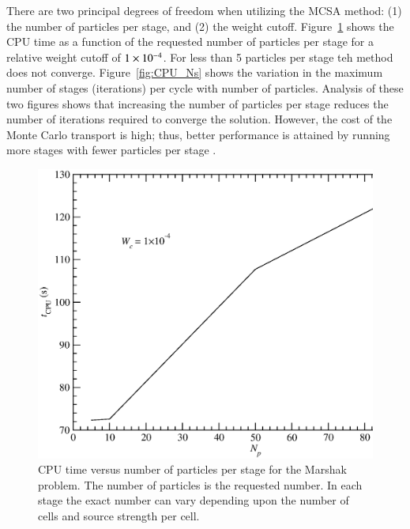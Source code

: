 \documentclass[preprint,12pt]{elsarticle}
\begin{document}
There are two principal degrees of freedom when utilizing the MCSA
method: (1) the number of particles per stage, and (2) the weight
cutoff.  Figure~\ref{fig:CPU_Np} shows the CPU time as a function of
the requested number of particles per stage for a relative weight
cutoff of $1\times 10^{-4}$.  For less than 5 particles per stage teh
method does not converge.  Figure~\ref{fig:CPU_Ns} shows the variation
in the maximum number of stages (iterations) per cycle with number of
particles.  Analysis of these two figures shows that increasing the
number of particles per stage reduces the number of iterations
required to converge the solution.  However, the cost of the Monte
Carlo transport is high; thus, better performance is attained by
running more stages with fewer particles per stage \cite{evans_2003}.

\begin{figure}[htpb!]
  \centerline{
    \includegraphics[width=5in,clip]{mrshk_np_CPU.eps}}
  \caption{CPU time versus number of particles per stage for the
    Marshak problem.  The number of particles is the requested number.
    In each stage the exact number can vary depending upon the number
    of cells and source strength per cell.}
  \label{fig:CPU_Np}
\end{figure}
\end{document}
